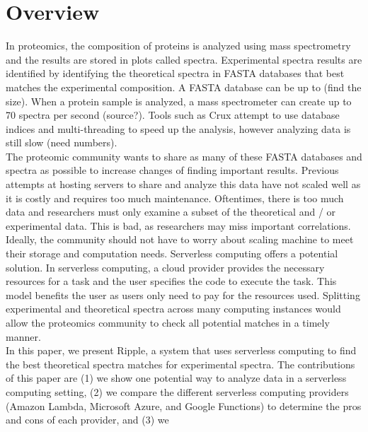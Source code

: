 \newcommand{\LineComment}[1]{\Statex \hfill\textit{#1}}
\vspace{-0.15in}
\section{Overview}
In proteomics, the composition of proteins is analyzed using mass spectrometry and the results are stored in plots called spectra.
Experimental spectra results are identified by identifying the theoretical spectra in FASTA databases that best matches the experimental composition.
A FASTA database can be up to (find the size).
When a protein sample is analyzed, a mass spectrometer can create up to 70 spectra per second (source?).
Tools such as Crux attempt to use database indices and multi-threading to speed up the analysis, however analyzing data is still slow (need numbers)\cite{crux}.\\
\newline
The proteomic community wants to share as many of these FASTA databases and spectra as possible to increase changes of finding important results.
Previous attempts at hosting servers to share and analyze this data have not scaled well as it is costly and requires too much maintenance.
Oftentimes, there is too much data and researchers must only examine a subset of the theoretical and / or experimental data.
This is bad, as researchers may miss important correlations.\\
\newline
Ideally, the community should not have to worry about scaling machine to meet their storage and computation needs.
Serverless computing offers a potential solution.
In serverless computing, a cloud provider provides the necessary resources for a task and the user specifies the code to execute the task.
This model benefits the user as users only need to pay for the resources used.
Splitting experimental and theoretical spectra across many computing instances would allow the proteomics community to check all potential matches in a timely manner.\\
\newline
In this paper, we present Ripple, a system that uses serverless computing to find the best theoretical spectra matches for experimental spectra.
The contributions of this paper are (1) we show one potential way to analyze data in a serverless computing setting, (2) we compare the different
serverless computing providers (Amazon Lambda, Microsoft Azure, and Google Functions) to determine the pros and cons of each provider, and (3) we

